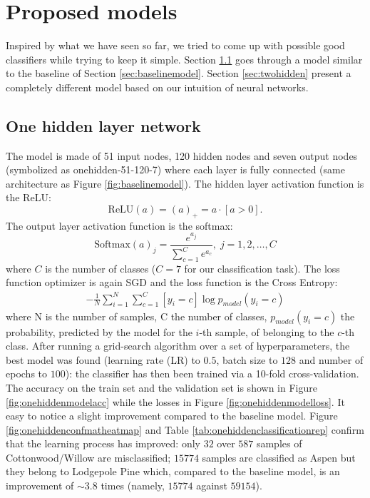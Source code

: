 \section{Proposed models}
Inspired by what we have seen so far, we tried to come up with possible good classifiers while trying to keep it simple. Section \ref{sec:onehidden} goes through a model similar to the baseline of Section \ref{sec:baselinemodel}. Section \ref{sec:twohidden} present a completely different model based on our intuition of neural networks.
\subsection{One hidden layer network}
\label{sec:onehidden}
The model is made of 51 input nodes, 120 hidden nodes and seven output nodes (symbolized as onehidden-51-120-7) where each layer is fully connected (same architecture as Figure \ref{fig:baselinemodel}). The hidden layer activation function is the ReLU:
\begin{equation}
\text{ReLU}(a) = (a)_+ = a\cdot[a>0].
\end{equation}
The output layer activation function is the softmax:
\begin{equation}
\text{Softmax}(a)_j = \frac{e^{a_j}}{\sum_{c=1}^{C} e^{a_c}}, \; j = 1,2,\dots,C 
\end{equation}
where $C$ is the number of classes ($C=7$ for our classification task). The loss function optimizer is again SGD and the loss function is the Cross Entropy:
\begin{equation}
\begin{aligned}
- \frac{1}{N} \sum_{i=1}^{N}\sum_{c=1}^{C} [y_i = c] \log p_{model}(y_i = c)
\end{aligned}
\end{equation}
where N is the number of samples, C the number of classes, $p_{model}(y_i = c)$ the probability, predicted by the model for the $i$-th sample, of belonging to the $c$-th class. After running a grid-search algorithm over a set of hyperparameters, the best model was found (learning rate (LR) to $0.5$, batch size to $128$ and number of epochs to $100$): the classifier has then been trained via a 10-fold cross-validation. The accuracy on the train set and the validation set is shown in Figure \ref{fig:onehiddenmodelacc} while the losses in Figure \ref{fig:onehiddenmodelloss}. It easy to notice a slight improvement compared to the baseline model. Figure \ref{fig:onehiddenconfmatheatmap} and Table \ref{tab:onehiddenclassificationrep} confirm that the learning process has improved: only $32$ over $587$ samples of Cottonwood/Willow are misclassified; $15774$ samples are classified as Aspen but they belong to Lodgepole Pine which, compared to the baseline model, is an improvement of $\sim3.8$ times (namely, $15774$ against $59154$).
